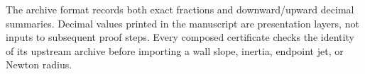 The archive format records both exact fractions and downward/upward decimal
summaries.  Decimal values printed in the manuscript are presentation layers,
not inputs to subsequent proof steps.  Every composed certificate checks the
identity of its upstream archive before importing a wall slope, inertia,
endpoint jet, or Newton radius.
